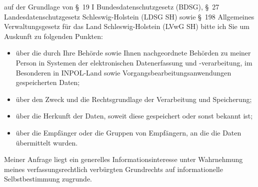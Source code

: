 auf der Grundlage von §~19 I Bundesdatenschutzgesetz (BDSG),
§~27 Landesdatenschutzgesetz Schleswig-Holstein (LDSG SH) sowie
§~198 Allgemeines Verwaltungsgesetz für das Land Schleswig-Holstein (LVwG SH)
bitte ich Sie um Auskunft zu folgenden Punkten:

\begin{itemize}
  \item über die durch Ihre Behörde sowie Ihnen nachgeordnete Behörden zu meiner
  Person in Systemen der elektronischen Datenerfassung und -verarbeitung, im Besonderen
  in INPOL-Land sowie Vorgangsbearbeitungsanwendungen gespeicherten Daten;

  \item über den Zweck und die Rechtsgrundlage der Verarbeitung und Speicherung;

  \item über die Herkunft der Daten, soweit diese gespeichert oder sonst bekannt ist;

  \item über die Empfänger oder die Gruppen von Empfängern, an die die Daten übermittelt wurden.
\end{itemize}

Meiner Anfrage liegt ein generelles Informationsinteresse unter Wahrnehmung
meines verfassungsrechtlich verbürgten Grundrechts auf informationelle
Selbstbestimmung zugrunde.
